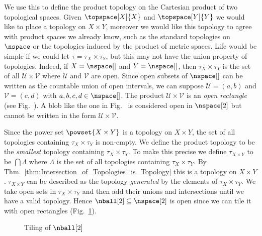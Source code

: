         We use this to define the product topology on the Cartesian
        product of two topological spaces. Given $\topspace[X]{X}$ and
        $\topspace[Y]{Y}$ we would like to place a topology on
        $X\times{Y}$, moreover we would like this topology to agree with
        product spaces we already know, such as the standard topologies
        on $\nspace$ or the topologies induced by the product of metric
        spaces. Life would be simple if we could let
        $\tau=\tau_{X}\times\tau_{Y}$, but this may not have the union
        property of topologies. Indeed, if $X=\nspace[]$ and
        $Y=\nspace[]$, then $\tau_{X}\times\tau_{Y}$ is the set of all
        $\mathcal{U}\times\mathcal{V}$ where $\mathcal{U}$ and
        $\mathcal{V}$ are open. Since open subsets of $\nspace[]$ can be
        written as the countable union of open intervals, we can suppose
        $\mathcal{U}=(a,b)$ and $\mathcal{V}=(c,d)$ with
        $a,b,c,d\in\nspace[]$. The product
        $\mathcal{U}\times\mathcal{V}$ is an \textit{open rectangle}
        (see Fig.~). A blob like the
        one in Fig.~ is considered
        open in $\nspace[2]$ but cannot be written in the form
        $\mathcal{U}\times\mathcal{V}$.
        \par\hfill\par
        Since the power set $\powset{X\times{Y}}$ is a topology on
        $X\times{Y}$, the set of all topologies containing
        $\tau_{X}\times\tau_{Y}$ is non-empty. We define the product
        topology to be the \textit{smallest} topology containing
        $\tau_{X}\times\tau_{Y}$. To make this precise we define
        $\tau_{X\times{Y}}$ to be $\bigcap\Lambda$ where $\Lambda$
        is the set of all topologies containing
        $\tau_{X}\times\tau_{Y}$. By
        Thm.~\ref{thm:Intersection_of_Topologies_is_Topology} this
        is a topology on $X\times{Y}$.%
        $\tau_{X\times{Y}}$ can be described as the topology
        \textit{generated} by the elements of
        $\tau_{X}\times\tau_{Y}$. We take open sets in
        $\tau_{X}\times\tau_{Y}$ and then add their unions and
        intersections until we have a valid topology. Hence
        $\nball[2]\subseteq\nspace[2]$ is open since we can tile it
        with open rectangles
        (Fig.~\ref{fig:Tiling_Open_Disc_by_Rectangles}).
        \begin{figure}[H]
            \centering
            \captionsetup{type=figure}
            \resizebox{!}{0.70\height}{%
            }
            \caption{Tiling of $\nball[2]$}
            \label{fig:Tiling_Open_Disc_by_Rectangles}
        \end{figure}
